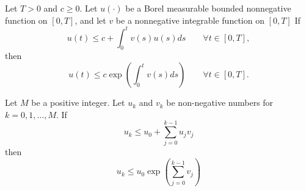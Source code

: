 \begin{thm}\label{thm:Gronwall}
	Let $T > 0$ and $c \geq 0$. Let $u(·)$ be a Borel measurable bounded nonnegative function on 
	$[0,T]$, and let $v$ be a nonnegative integrable function on $[0,T]$
	If
	$$
		u(t) \leq c 
			+\int_{0}^{t} v(s)u(s)ds \qquad \forall t \in [0,T],
	$$
	then
	$$
	u(t) \leq c\exp
		\left(
			\int_{0}^{t} v(s)ds 
		\right)
		\qquad \forall t \in [0,T].
	$$
	
\end{thm}

\begin{thm}\label{thm:DiscreteGronwall}
	Let $M$ be a positive integer. Let $u_k$ and $v_k$ be non-negative numbers for $k=0,1,\dots,M$. 
	If
	$$
		u_k\leq u_0 + \sum_{j=0}^{k-1} u_j v_j
	$$
	then
	\begin{equation}
		u_k \leq u_0 
		\exp
		\left(
		\sum_{j=0}^{k-1}v_j
		\right)
	\end{equation}
		
\end{thm}

